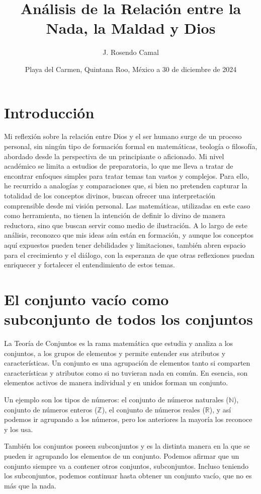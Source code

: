 \documentclass[letterpaper,13pt]{article}
\title{Análisis de la Relación entre la Nada, la Maldad y Dios} %
\author{J. Rosendo Camal} %
\date{Playa del Carmen, Quintana Roo, México a 30 de diciembre de 2024} %
\begin{document}
\maketitle

\section{Introducción}

Mi reflexión sobre la relación entre Dios y el ser humano surge de un proceso personal, sin ningún tipo de formación formal en matemáticas, teología o filosofía, abordado desde la perspectiva de un principiante o aficionado. Mi nivel académico se limita a estudios de preparatoria, lo que me lleva a tratar de encontrar enfoques simples para tratar temas tan vastos y complejos. Para ello, he recurrido a analogías y comparaciones que, si bien no pretenden capturar la totalidad de los conceptos divinos, buscan ofrecer una interpretación comprensible desde mi visión personal. Las matemáticas, utilizadas en este caso como herramienta, no tienen la intención de definir lo divino de manera reductora, sino que buscan servir como medio de ilustración. A lo largo de este análisis, reconozco que mis ideas aún están en formación, y aunque los conceptos aquí expuestos pueden tener debilidades y limitaciones, también abren espacio para el crecimiento y el diálogo, con la esperanza de que otras reflexiones puedan enriquecer y fortalecer el entendimiento de estos temas.

\section{El conjunto vacío como subconjunto de todos los conjuntos}

La Teoría de Conjuntos es la rama matemática que estudia y analiza a los conjuntos, a los grupos de elementos y permite entender sus atributos y características. Un conjunto es una agrupación de elementos tanto si comparten características y atributos como si no tuvieran nada en común. En esencia, son elementos activos de manera individual y en unidos forman un conjunto.

Un ejemplo son los tipos de números: el conjunto de números naturales (\( \mathbb{N} \)), conjunto de números enteros (\( \mathbb{Z} \)), el conjunto de números reales (\( \mathbb{R} \)), y así podemos ir agrupando a los números, pero los anteriores la mayoría los reconoce y los usa.

También los conjuntos poseen subconjuntos y es la distinta manera en la que se pueden ir agrupando los elementos de un conjunto. Podemos afirmar que un conjunto siempre va a contener otros conjuntos, subconjuntos. Incluso teniendo los subconjuntos, podemos continuar hasta obtener un conjunto vacío, que no es más que la nada.
\end{document}

